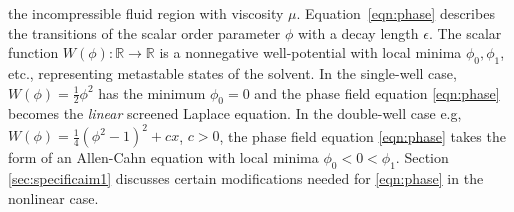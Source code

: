 the incompressible fluid region with viscosity $\mu$.
Equation~\eqref{eqn:phase} describes the
transitions of the scalar order parameter $\phi$ with a decay length
$\epsilon$.
The scalar function $W(\phi) : \mathbb{R} \to \mathbb{R}$ is a nonnegative
well-potential with local minima $\phi_0, \phi_1$,  etc.,
representing metastable states of the solvent.
In the single-well case, $W(\phi) = \frac{1}{2}\phi^2$
has the minimum $\phi_0 = 0$ and the phase field equation
\eqref{eqn:phase} becomes the \emph{linear} screened Laplace equation.
In the double-well case e.g, $W(\phi) = \frac{1}{4}(\phi^2-1)^2+cx$, $c > 0$,
the phase field equation \eqref{eqn:phase} takes the form of an
Allen-Cahn equation with local minima $\phi_0 < 0 < \phi_1$.
Section \ref{sec:specificaim1} discusses certain
modifications needed for \eqref{eqn:phase} in the nonlinear case.

